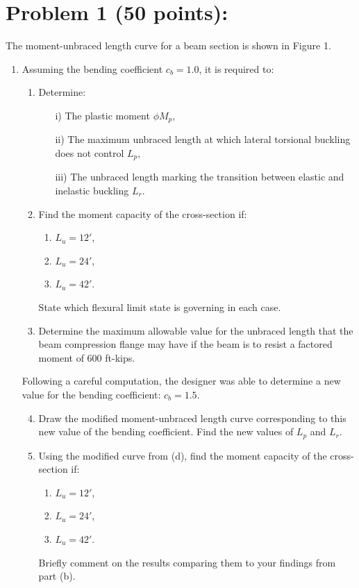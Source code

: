 \documentclass[12pt]{article}
\begin{document}
\section*{Problem 1 (50 points):}
The moment-unbraced length curve for a beam section is shown in Figure 1.

\begin{enumerate}
    \item Assuming the bending coefficient \(c_b = 1.0\), it is required to:
    \begin{enumerate}
        \item Determine:
        \begin{enumerate}
            \item[i)] The plastic moment \(\phi M_p\),
            \item[ii)] The maximum unbraced length at which lateral torsional buckling does not control \(L_p\),
            \item[iii)] The unbraced length marking the transition between elastic and inelastic buckling \(L_r\).
        \end{enumerate}
        \item Find the moment capacity of the cross-section if:
        \begin{enumerate}
            \item \(L_u = 12'\),
            \item \(L_u = 24'\),
            \item \(L_u = 42'\).
        \end{enumerate}
        State which flexural limit state is governing in each case.
        \item Determine the maximum allowable value for the unbraced length that the beam compression flange may have if the beam is to resist a factored moment of 600 ft-kips.
    \end{enumerate}
    
    Following a careful computation, the designer was able to determine a new value for the bending coefficient: \(c_b = 1.5\).
    \begin{enumerate}
        \setcounter{enumii}{3}
        \item Draw the modified moment-unbraced length curve corresponding to this new value of the bending coefficient. Find the new values of \(L_p\) and \(L_r\).
        \item Using the modified curve from (d), find the moment capacity of the cross-section if:
        \begin{enumerate}
            \item \(L_u = 12'\),
            \item \(L_u = 24'\),
            \item \(L_u = 42'\).
        \end{enumerate}
        Briefly comment on the results comparing them to your findings from part (b).
    \end{enumerate}
\end{enumerate}
\end{document}
